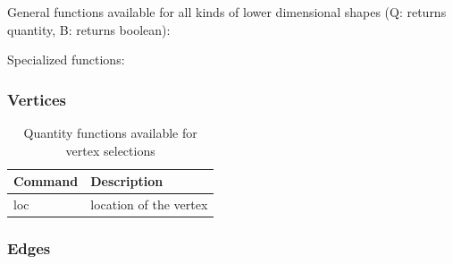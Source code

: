 General functions available for all kinds of lower dimensional shapes (Q: returns quantity, B: returns boolean):

Specialized functions:




\subsubsection{Vertices}

\begin{table}[h!]
\centering
\begin{tabular}{ll}
Command & Description \\
\hline
loc                        & location of the vertex\\
\end{tabular}
\caption{Quantity functions available for vertex selections}
\label{tab:iscad_feat_general_qty}
\end{table}




\subsubsection{Edges}

